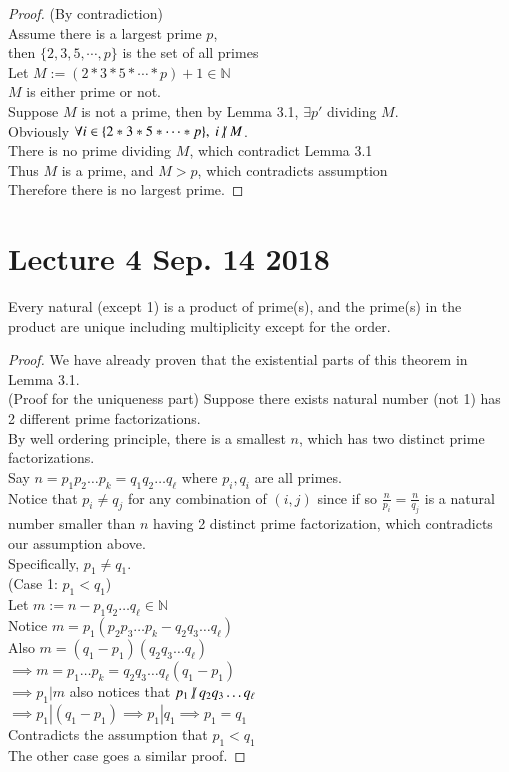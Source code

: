 \documentclass[10pt]{article}
\begin{document}
	\begin{proof}
		(By contradiction) \\
		Assume there is a largest prime $p$, \\
		then $\{2,3,5,\cdots,p\}$ is the set of all primes \\
		Let $M := (2*3*5*\cdots*p)+1 \in \mathbb{N}$ \\
		$M$ is either prime or not. \\
		Suppose $M$ is not a prime, then by Lemma 3.1, $\exists p' $ dividing $M$. \\
		Obviously $\forall i \in \{2*3*5*\cdots*p\},\ i \centernot | M$. \\
		There is no prime dividing $M$, which contradict Lemma 3.1 \\
		Thus $M$ is a prime, and $M > p$, which contradicts assumption \\
		Therefore there is no largest prime.
	\end{proof}
	
	\section{Lecture 4 Sep. 14 2018}
	\begin{theorem}
		Every natural (except 1) is a product of prime(s), and the prime(s) in the product are unique including multiplicity except for the order.
	\end{theorem}
	\begin{proof}
		We have already proven that the existential parts of this theorem in Lemma 3.1. \\
		(Proof for the uniqueness part) Suppose there exists natural number (not 1) has 2 different prime factorizations. \\
		By well ordering principle, there is a smallest $n$, which has two distinct prime factorizations. \\
		Say $n = p_1 p_2 \dots p_k = q_1 q_2 \dots q_\ell $ where $p_i, q_i$ are all primes. \\
		Notice that $p_i \neq q_j$ for any combination of $(i,j)$ since if so $\frac{n}{p_i}=\frac{n}{q_j}$ is a natural number smaller than $n$ having 2 distinct prime factorization, which contradicts our assumption above. \\
		Specifically, $p_1 \neq q_1$. \\
		(Case 1: $p_1 < q_1$) \\
		Let $m := n - p_1 q_2 \dots q_\ell \in \mathbb{N}$ \\
		Notice $m = p_1 (p_2 p_3 \dots p_k - q_2 q_3 \dots q_\ell)$ \\
		Also $m = (q_1 - p_1) (q_2 q_3 \dots q_\ell)$ \\
		$\implies m = p_1 \dots p_k = q_2 q_3 \dots q_\ell (q_1 - p_1)$ \\
		$\implies p_1 | m $ also notices that $p_1 \centernot | q_2 q_3 \dots q_\ell$ \\
		$\implies p_1 |  (q_1 - p_1) \implies p_1 | q_1 \implies p_1 = q_1$ \\
		Contradicts the assumption that $p_1 < q_1$ \\
		The other case goes a similar proof.
	\end{proof}
	
\end{document}
